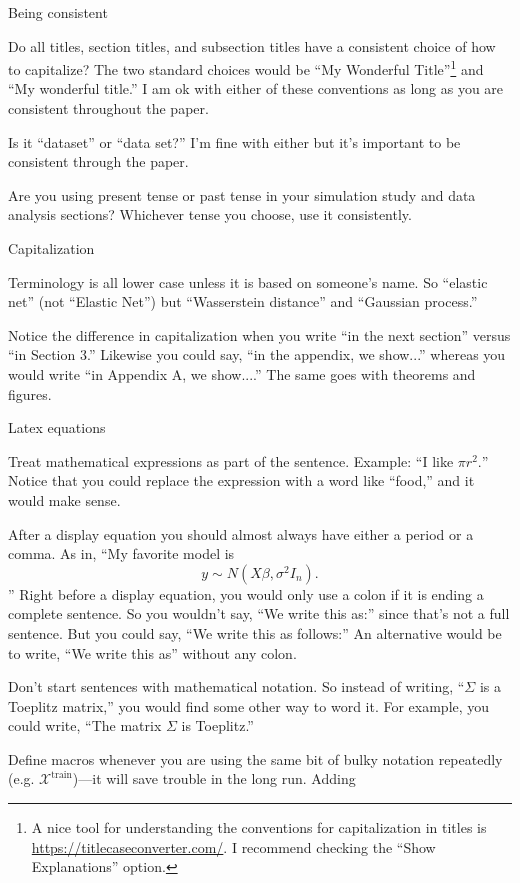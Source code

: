 \documentclass[11pt]{article}
\begin{document}
\begin{todolist}
\item Being consistent
  \begin{todolist}
  \item Do all titles, section titles, and subsection titles have a
    consistent choice of how to capitalize?  The two standard choices
    would be ``My Wonderful Title''\footnote{A nice tool for understanding
    the conventions for capitalization in titles is
    \url{https://titlecaseconverter.com/}. I recommend checking the
    ``Show Explanations'' option.} and ``My wonderful title.''  I am ok with
    either of these conventions as long as you are consistent
    throughout the paper.
  \item Is it ``dataset'' or ``data set?''  I'm fine with either but
    it's important to be consistent through the paper.
    \item Are you using present tense or past tense in your simulation
      study and data analysis sections?  Whichever tense you choose,
      use it consistently.  
  \end{todolist}
\item Capitalization
  \begin{todolist}
  \item Terminology is all lower case unless it is based on someone's
    name.  So ``elastic net'' (not ``Elastic Net'') but ``Wasserstein
    distance'' and ``Gaussian process.''
    \item 
Notice the difference in capitalization when you write ``in the next section'' versus ``in Section 3.''  Likewise you could say, ``in the appendix, we show...'' whereas you would write ``in Appendix A, we show....''  The same goes with theorems and figures.
  \end{todolist}
\item Latex equations
  \begin{todolist}
\item Treat mathematical expressions as part of the sentence.  Example: ``I like
  $\pi r^2.$''  Notice that you could replace the expression with a
  word like ``food,'' and it would make sense.
\item After a display equation you should almost always have either a period or a comma.  As in, ``My favorite model is
\[
y\sim N(X\beta, \sigma^2I_n).
\]''
Right before a display equation, you would only use a colon if it is
ending a complete sentence. So you wouldn't say, ``We write this as:''
since that's not a full sentence. But you could say, ``We write this
as follows:''  An alternative would be to write, ``We write this as''
without any colon.
\item Don't start sentences with mathematical notation.  So instead of
  writing, ``$\Sigma$ is a Toeplitz matrix,'' you would find some
  other way to word it.  For example, you could write, ``The matrix
  $\Sigma$ is Toeplitz.''
\item Define macros whenever you are using the same bit of bulky
  notation repeatedly (e.g. $\mathcal X^{\text{train}}$)---it will save trouble
  in the long run.  Adding 


\end{todolist}
\end{todolist}
\end{document}
